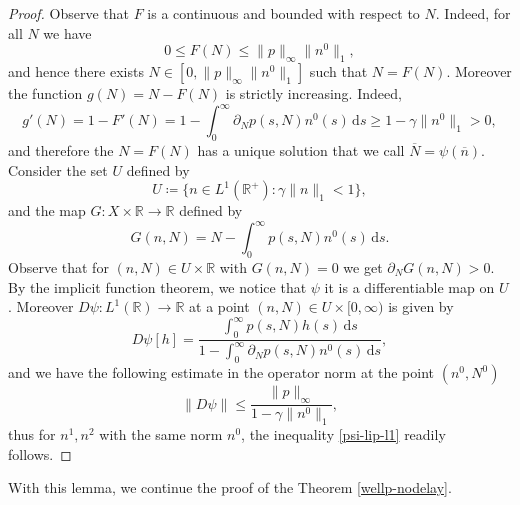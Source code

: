 \documentclass[11pt,a4paper]{article}
\newcommand{\R}{\mathbb{R}}
\newcommand{\dd}{\mathrm{d}}
\begin{document}
\begin{proof}
    Observe that $F$ is a continuous and bounded with respect to $N$. Indeed, for all $N$ we have 
    \begin{equation*}0\le F(N)\le \|p\|_\infty\|n^0\|_1,\end{equation*}
    and hence there exists $N\in [0,\|p\|_\infty\|n^0\|_1]$ such that $N=F(N)$. Moreover the function $g(N)=N-F(N)$ is strictly increasing. Indeed,
    \begin{equation*}g'(N)=1-F'(N)=1-\int_0^\infty\partial_N p(s,N)n^0(s)\,\dd s\ge 1-\gamma\|n^0\|_1>0,\end{equation*}
    and therefore the $N=F(N)$ has a unique solution that we call $\overline{N}=\psi(\overline{n})$. Consider the set $U$ defined by
    \begin{equation*}U\coloneqq\{n\in L^1(\R^+)\colon \gamma\|n\|_1<1\},\end{equation*}
    and  the map $G\colon X\times\R\to\R$ defined by
    \begin{equation*}G(n,N)=N-\int_0^\infty p(s,N)n^0(s)\,\dd s.\end{equation*}
    Observe that for $(n,N)\in U\times\R$ with $G(n,N)=0$ we get $\partial_N G(n,N)>0$. By the implicit function theorem, we notice that $\psi$ it is a differentiable map on $U$. Moreover $D\psi\colon L^1(\R)\to\R$ at a point $(n,N)\in U\times[0,\infty)$  is given by\begin{equation*}D\psi[h]=\frac{\int_0^\infty p(s,N)h(s)\,\dd s}{1-\int_0^\infty\partial_N p(s,N)n^0(s)\,\dd s},\end{equation*}
    and we have the following estimate in the operator norm at the point $(n^0,N^0)$
\begin{equation*}
    \|D\psi\|\le \frac{\|p\|_\infty}{1-\gamma\|n^0\|_1},
\end{equation*}
    thus for $n^1,n^2$ with the same norm $n^0$, the inequality \eqref{psi-lip-l1} readily follows.
\end{proof}

With this lemma, we continue the proof of the Theorem \ref{wellp-nodelay}.
\end{document}
